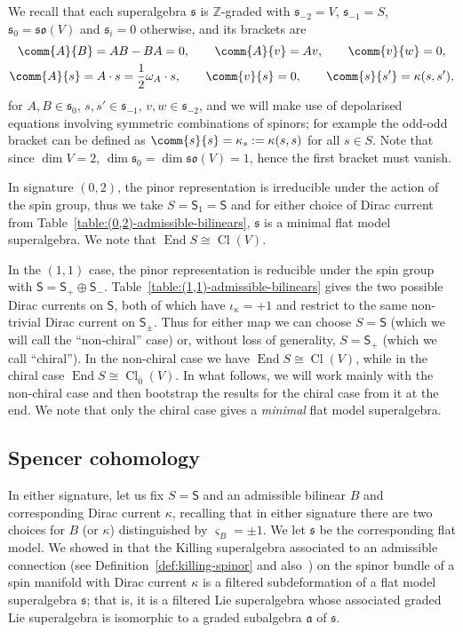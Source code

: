 \documentclass[10pt,a4paper]{amsart}
\numberwithin{equation}{section}
\newcommand{\fa}{\mathfrak{a}}
\newcommand{\fs}{\mathfrak{s}}
\newcommand{\fso}{\mathfrak{so}}
\newcommand{\ZZ}{\mathbb{Z}}
\newcommand{\ssS}{\mathsf{S}}
\newcommand{\1}{\mathbbm{1}}
\DeclareMathOperator{\End}{End}
\DeclareMathOperator{\Cl}{Cl}
\begin{document}
We recall that each superalgebra $\fs$ is $\ZZ$-graded with $\fs_{-2}=V$, $\fs_{-1}=S$, $\fs_0=\fso(V)$ and $\fs_i=0$ otherwise, and its brackets are
\begin{gather}
	\comm{A}{B} = AB-BA = 0,\qquad	
	\comm{A}{v} = Av,\qquad
	 \comm{v}{w} = 0,\nonumber	\\
	\comm{A}{s} = A\cdot s = \frac{1}{2}\omega_A\cdot s,\qquad
	 \comm{v}{s} = 0,\qquad
	 \comm{s}{s'} = \kappa(s,s'),\label{eq:2d-flat-brackets}
\end{gather}
for $A,B\in\fs_0$, $s,s'\in\fs_{-1}$, $v,w\in\fs_{-2}$, and we will make use of depolarised equations involving symmetric combinations of spinors; for example the odd-odd bracket can be defined as $\comm{s}{s}=\kappa_s:=\kappa(s,s)$ for all $s\in S$. Note that since $\dim V=2$, $\dim\fs_0=\dim\fso(V)=1$, hence the first bracket must vanish.

In signature $(0,2)$, the pinor representation is irreducible under the action of the spin group, thus we take $S=\ssS_1=\ssS$ and for either choice of Dirac current from Table~\ref{table:(0,2)-admissible-bilinears}, $\fs$ is a minimal flat model superalgebra. We note that $\End S\cong\Cl(V)$.

In the $(1,1)$ case, the pinor representation is reducible under the spin group with $\ssS=\ssS_+\oplus\ssS_-$. Table~\ref{table:(1,1)-admissible-bilinears} gives the two possible Dirac currents on $\ssS$, both of which have $\iota_\kappa=+1$ and restrict to the same non-trivial Dirac current on $\ssS_\pm$. Thus for either map we can choose $S=\ssS$ (which we will call the ``non-chiral'' case) or, without loss of generality, $S=\ssS_+$ (which we call ``chiral''). In the non-chiral case we have $\End S\cong\Cl(V)$, while in the chiral case $\End S\cong\Cl_{\overline 0}(V)$. In what follows, we will work mainly with the non-chiral case and then bootstrap the results for the chiral case from it at the end. We note that only the chiral case gives a \emph{minimal} flat model superalgebra.


\subsection{Spencer cohomology}

In either signature, let us fix $S=\ssS$ and an admissible bilinear $B$ and corresponding Dirac current $\kappa$, recalling that in either signature there are two choices for $B$ (or $\kappa$) distinguished by $\varsigma_B=\pm 1$. We let $\fs$ be the corresponding flat model. We showed in \cite[Theorem~3.10]{Beckett2024_2} that the Killing superalgebra associated to an admissible connection (see Definition~\ref{def:killing-spinor} and also~\cite[Definition~3.6]{Beckett2024_2}) on the spinor bundle of a spin manifold with Dirac current $\kappa$ is a filtered subdeformation of a flat model superalgebra $\fs$; that is, it is a filtered Lie superalgebra whose associated graded Lie superalgebra is isomorphic to a graded subalgebra $\fa$ of $\fs$.
\end{document}
